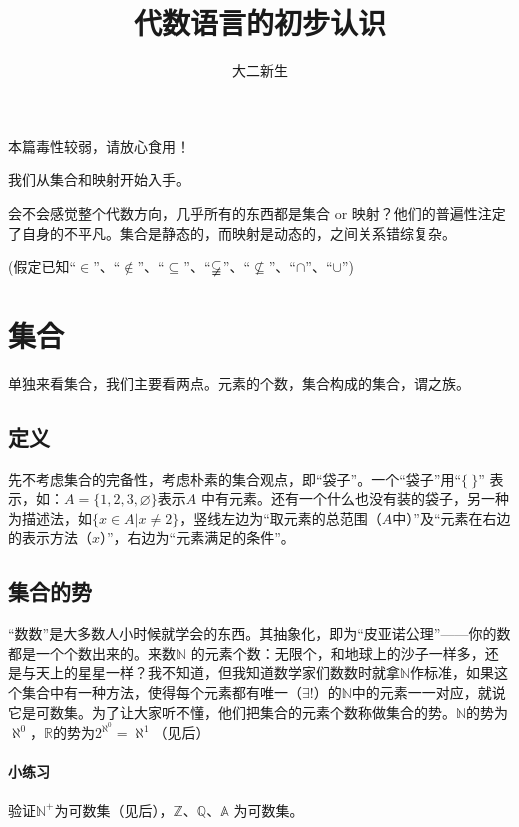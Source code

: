 \documentclass[UTF8]{ctexart}
\author{大二新生}
\title{代数语言的初步认识}
\begin{document}
    \maketitle
    \tableofcontents
本篇毒性较弱，请放心食用！

我们从集合和映射开始入手。

 会不会感觉整个代数方向，几乎所有的东西都是集合 or 映射？他们的普遍性注定了自身的不平凡。集合是静态的，而映射是动态的，之间关系错综复杂。

 (假定已知“$\in$”、“$\notin$”、“$\subseteq$”、“$\varsubsetneqq$”、“$\not\subseteq$”、“$\cap$”、“$\cup$”)

\section{集合}

单独来看集合，我们主要看两点。元素的个数，集合构成的集合，谓之族。

\subsection{定义}

先不考虑集合的完备性，考虑朴素的集合观点，即“袋子”。一个“袋子”用“$\lbrace\ \rbrace$” 表示，如：$A=\lbrace 1,2,3, \varnothing\rbrace$表示$A$ 中有元素。还有一个什么也没有装的袋子，另一种为描述法，如$\lbrace x\in A \big| x \not= 2\rbrace$，竖线左边为“取元素的总范围（$A$中）”及“元素在右边的表示方法（$x$）”，右边为“元素满足的条件”。

\subsection{集合的势}

“数数”是大多数人小时候就学会的东西。其抽象化，即为“皮亚诺公理”——你的数都是一个个数出来的。来数$\mathbb{N}$ 的元素个数：无限个，和地球上的沙子一样多，还是与天上的星星一样？我不知道，但我知道数学家们数数时就拿$\mathbb{N}$作标准，如果这个集合中有一种方法，使得每个元素都有唯一（$\exists !$）的$\mathbb{N}$中的元素一一对应，就说它是可数集。为了让大家听不懂，他们把集合的元素个数称做集合的势。$\mathbb{N}$的势为$\aleph^0$，$\mathbb{R}$的势为$2^{\aleph^0} = \aleph^1$（见后）

\paragraph{小练习}

验证$\mathbb{N}^+$为可数集（见后），$\mathbb{Z}$、$\mathbb{Q}$、$\mathbb{A}$ 为可数集。
\end{document}
